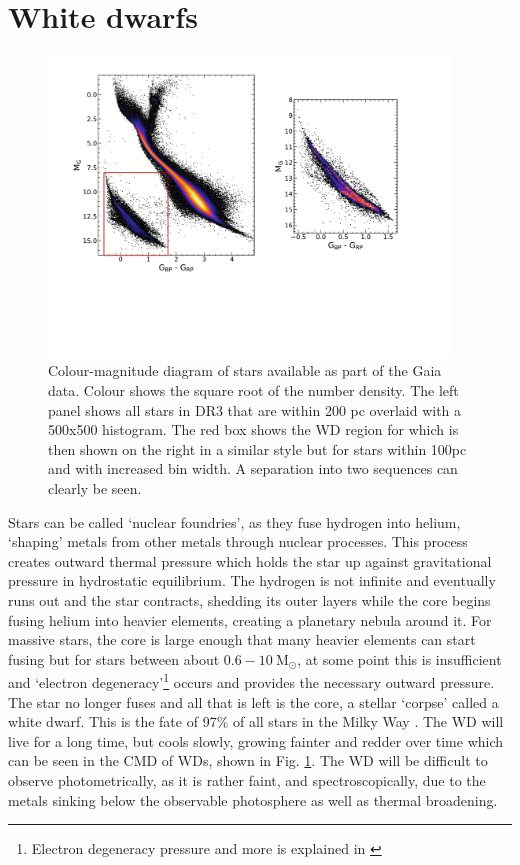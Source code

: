 \section{White dwarfs}\label{sec:p2-whitedwarfs}
\begin{figure}[t!]
    \centering
    \includegraphics[width=0.95\textwidth]{images/gaiacmr.pdf}
    \caption{Colour-magnitude diagram of stars available as part of the Gaia data. Colour shows the square root of the number density. The left panel shows all stars in DR3 that are within 200 pc overlaid with a 500x500 histogram. The red box shows the WD region for which is then shown on the right in a similar style but for stars within 100pc and with increased bin width. A separation into two sequences can clearly be seen.} %
    \label{fig:cmd}
\end{figure}
Stars can be called `nuclear foundries', as they fuse hydrogen into helium, `shaping' metals from other metals through nuclear processes. This process creates outward thermal pressure which holds the star up against gravitational pressure in hydrostatic equilibrium. The hydrogen is not infinite and eventually runs out and the star contracts, shedding its outer layers while the core begins fusing helium into heavier elements, creating a planetary nebula around it. For massive stars, the core is large enough that many heavier elements can start fusing but for stars between about $0.6-10\ \mathrm{M}_\odot$, at some point this is insufficient and `electron degeneracy'\footnote{Electron degeneracy pressure and more is explained in \cite{kippenhahn:12}} occurs and provides the necessary outward pressure. The star no longer fuses and all that is left is the core, a stellar `corpse' called a white dwarf. This is the fate of 97\% of all stars in the Milky Way \citep{fontaine:01}. The WD will live for a long time, but cools slowly, growing fainter and redder over time which can be seen in the CMD of WDs, shown in Fig. \ref{fig:cmd}. The WD will be difficult to observe photometrically, as it is rather faint, and spectroscopically, due to the metals sinking below the observable photosphere as well as thermal broadening. 


